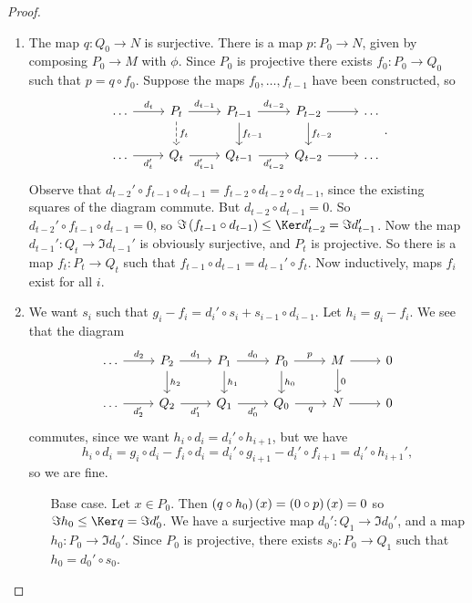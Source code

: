 \begin{proof}
\hfill
\begin{enumerate}
\item The map $ q : Q_0 \to N $ is surjective. There is a map $ p : P_0 \to N $, given by composing $ P_0 \to M $ with $ \phi $. Since $ P_0 $ is projective there exists $ f_0 : P_0 \to Q_0 $ such that $ p = q \circ f_0 $. Suppose the maps $ f_0, \dots, f_{t - 1} $ have been constructed, so
$$
\begin{tikzcd}
\dots \arrow{r}{d_t} & P_t \arrow{r}{d_{t - 1}} \arrow[dashed]{d}{f_t} & P_{t - 1} \arrow{r}{d_{t - 2}} \arrow{d}{f_{t - 1}} & P_{t - 2} \arrow{d}{f_{t - 2}} \arrow{r} & \dots \\
\dots \arrow[swap]{r}{d_t'} & Q_t \arrow[swap]{r}{d_{t - 1}'} & Q_{t - 1} \arrow[swap]{r}{d_{t - 2}'} & Q_{t - 2} \arrow[swap]{r} & \dots
\end{tikzcd}.
$$
Observe that $ d_{t - 2}' \circ f_{t - 1} \circ d_{t - 1} = f_{t - 2} \circ d_{t - 2} \circ d_{t - 1} $, since the existing squares of the diagram commute. But $ d_{t - 2} \circ d_{t - 1} = 0 $. So $ d_{t - 2}' \circ f_{t - 1} \circ d_{t - 1} = 0 $, so $ \Im \br{f_{t - 1} \circ d_{t - 1}} \le \Ker d_{t - 2}' = \Im d_{t - 1}' $. Now the map $ d_{t - 1}' : Q_t \to \Im d_{t - 1}' $ is obviously surjective, and $ P_t $ is projective. So there is a map $ f_t : P_t \to Q_t $ such that $ f_{t - 1} \circ d_{t - 1} = d_{t - 1}' \circ f_t $. Now inductively, maps $ f_i $ exist for all $ i $.
\item We want $ s_i $ such that $ g_i - f_i = d_i' \circ s_i + s_{i - 1} \circ d_{i - 1} $. Let $ h_i = g_i - f_i $. We see that the diagram
$$
\begin{tikzcd}
\dots \arrow{r}{d_2} & P_2 \arrow{r}{d_1} \arrow{d}{h_2} & P_1 \arrow{r}{d_0} \arrow{d}{h_1} & P_0 \arrow{r}{p} \arrow{d}{h_0} & M \arrow{r} \arrow{d}{0} & 0 \\
\dots \arrow[swap]{r}{d_2'} & Q_2 \arrow[swap]{r}{d_1'} & Q_1 \arrow[swap]{r}{d_0'} & Q_0 \arrow[swap]{r}{q} & N \arrow{r} & 0
\end{tikzcd}
$$
commutes, since we want $ h_i \circ d_i = d_i' \circ h_{i + 1} $, but we have
$$ h_i \circ d_i = g_i \circ d_i - f_i \circ d_i = d_i' \circ g_{i + 1} - d_i' \circ f_{i + 1} = d_i' \circ h_{i + 1}', $$
so we are fine.
\begin{itemize}[leftmargin=1in]
\item[Base case.] Let $ x \in P_0 $. Then $ \br{q \circ h_0}\br{x} = \br{0 \circ p}\br{x} = 0 $ so $ \Im h_0 \le \Ker q = \Im d_0' $. We have a surjective map $ d_0' : Q_1 \to \Im d_0' $, and a map $ h_0 : P_0 \to \Im d_0' $. Since $ P_0 $ is projective, there exists $ s_0 : P_0 \to Q_1 $ such that $ h_0 = d_0' \circ s_0 $.

\end{itemize}
\end{enumerate}
\end{proof}
